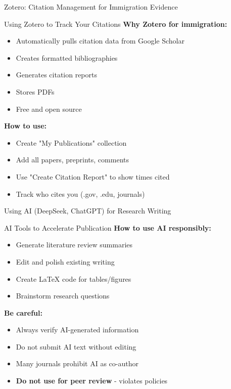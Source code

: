 \documentclass[11pt]{beamer}
\begin{document}
	\begin{frame}{Zotero: Citation Management for Immigration Evidence}
		\small
		\begin{block}{Using Zotero to Track Your Citations}
			\textbf{Why Zotero for immigration:}
			\begin{itemize}
				\item Automatically pulls citation data from Google Scholar
				\item Creates formatted bibliographies
				\item Generates citation reports
				\item Stores PDFs
				\item Free and open source
			\end{itemize}
			\textbf{How to use:}
			\begin{itemize}
				\item Create "My Publications" collection
				\item Add all papers, preprints, comments
				\item Use "Create Citation Report" to show times cited
				\item Track who cites you (.gov, .edu, journals)
			\end{itemize}
		\end{block}
	\end{frame}
	
	\begin{frame}{Using AI (DeepSeek, ChatGPT) for Research Writing}
		\small
		\begin{block}{AI Tools to Accelerate Publication}
			\textbf{How to use AI responsibly:}
			\begin{itemize}
				\item Generate literature review summaries
				\item Edit and polish existing writing
				\item Create LaTeX code for tables/figures
				\item Brainstorm research questions
			\end{itemize}
			\textbf{Be careful:}
			\begin{itemize}
				\item Always verify AI-generated information
				\item Do not submit AI text without editing
				\item Many journals prohibit AI as co-author
				\item \textbf{Do not use for peer review} - violates policies
			\end{itemize}
		\end{block}
	\end{frame}
	
\end{document}
